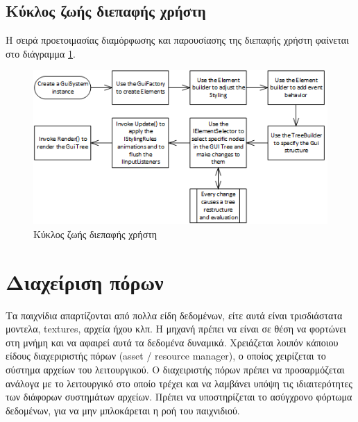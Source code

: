 \newpage
\subsection{Κύκλος ζωής διεπαφής χρήστη}
Η σειρά προετοιμασίας διαμόρφωσης και παρουσίασης της διεπαφής χρήστη φαίνεται στο διάγραμμα \ref{fig:ui_usage}.

\begin{figure}[h!]
	\centering
	\includegraphics[width=130mm]{Images/gui_usage}
	\caption{Κύκλος ζωής διεπαφής χρήστη}
	\label{fig:ui_usage}
\end{figure}
\newpage

\section{Διαχείριση πόρων}
Τα παιχνίδια απαρτίζονται από πολλα είδη δεδομένων, είτε αυτά είναι τρισδιάστατα μοντελα, textures, αρχεία ήχου κλπ. Η μηχανή πρέπει να είναι σε θέση να φορτώνει στη μνήμη και να αφαιρεί αυτά τα δεδομένα δυναμικά. Χρειάζεται λοιπόν κάποιου είδους διαχεριριστής πόρων (asset / resource manager), ο οποίος χειρίζεται το σύστημα αρχείων του λειτουργικού. Ο διαχειριστής πόρων πρέπει να προσαρμόζεται ανάλογα με το λειτουργικό στο οποίο τρέχει και να λαμβάνει υπόψη τις ιδιαιτερότητες των διάφορων συστημάτων αρχείων. Πρέπει να υποστηρίζεται το ασύγχρονο φόρτωμα δεδομένων, για να μην μπλοκάρεται η ροή του παιχνιδιού.

